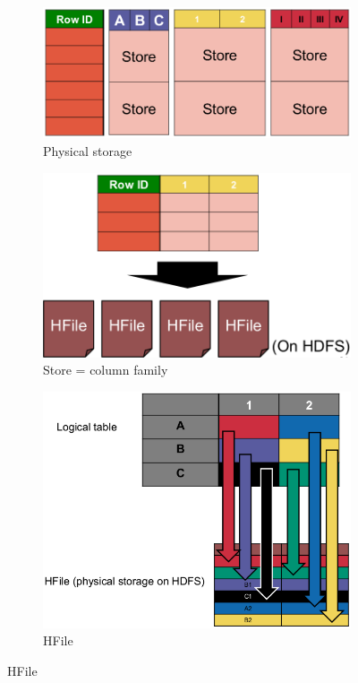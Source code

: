 \documentclass[11pt,oneside,a4paper]{article}
\begin{document}
\begin{figure}[hb!]
	\centering
	\begin{subfigure}[t]{.3\textwidth}
		\centering
		\includegraphics[width=0.9\linewidth]{figures/hbase_physical_storage}
		\caption{Physical storage}
		\label{fig:hbasephysicalstorage}
	\end{subfigure}%
	\begin{subfigure}[t]{.3\textwidth}
		\centering
		\includegraphics[width=0.9\linewidth]{figures/hbase_store}
		\caption{Store = column family}
		\label{fig:hbasestore}
	\end{subfigure}
	\begin{subfigure}[t]{.3\textwidth}
		\centering
		\includegraphics[width=0.9\linewidth]{figures/hbase_hfile}
		\caption{HFile}
		\label{fig:hbasehfile}
	\end{subfigure}
\end{figure}
\end{document}
